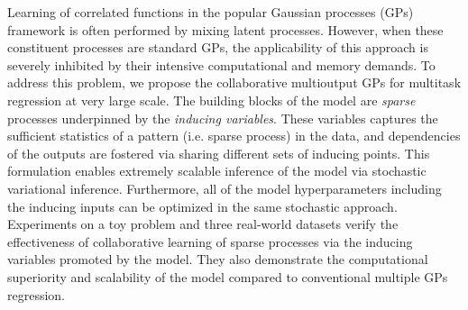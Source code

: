 Learning of correlated functions in the popular Gaussian processes (GPs) framework is often performed by mixing latent processes.
However, when these constituent processes are standard GPs, the applicability of this approach is severely inhibited by their intensive computational and memory demands.
To address this problem, we propose the collaborative multioutput GPs for multitask regression at very large scale.
The building blocks of the model are \emph{sparse} processes underpinned by the \emph{inducing variables}.
These variables captures the sufficient statistics of a pattern (i.e. sparse process) in the data, and dependencies of the outputs are fostered via sharing different sets of inducing points.
This formulation enables extremely scalable inference of the model via stochastic variational inference.
Furthermore, all of the model hyperparameters including the inducing inputs can be optimized in the same stochastic approach.
Experiments on a toy problem and three real-world datasets verify the effectiveness of collaborative learning of sparse processes via the inducing variables promoted by the model.
They also demonstrate the computational superiority and scalability of the model compared to conventional multiple GPs regression.
